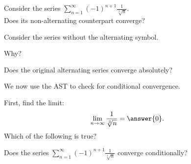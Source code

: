 \documentclass{ximera}
\begin{document}
\begin{problem}
Consider the series $\displaystyle{\sum_{n=1}^\infty (-1)^{n+1} \frac{1}{\sqrt[3] n}}$.\\
Does its non-alternating counterpart converge?
\begin{hint} 
Consider the series without the alternating symbol.
\end{hint}
\begin{multipleChoice}
\end{multipleChoice}

Why?
\begin{multipleChoice}
\end{multipleChoice}




Does the original alternating series converge absolutely?
\begin{multipleChoice}
\end{multipleChoice}

We now use the AST to check for conditional convergence.

First, find the limit:
\[
\lim_{n\to\infty} \frac{1}{\sqrt[3] n} = \answer{0}.
\]
Which of the following is true?
\begin{multipleChoice}
\end{multipleChoice}


Does the series $\displaystyle{\sum_{n=1}^\infty (-1)^{n+1} \frac{1}{\sqrt[3] n}}$ converge conditionally?
\begin{multipleChoice}
\end{multipleChoice}

\end{problem}
\end{document}
